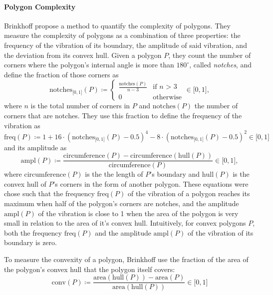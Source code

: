 \paragraph{Polygon Complexity}

Brinkhoff \etal{} \cite{brinkhoff1995measuring} propose a method to quantify the complexity of polygons.
They measure the complexity of polygons as a combination of three properties: the frequency of the vibration of its boundary, the amplitude of said vibration, and the deviation from its convex hull.
Given a polygon $P$, they count the number of corners where the polygon's internal angle is more than $180^\circ$, called \emph{notches}, and define the fraction of those corners as
%
\begin{equation*}
\text{notches}_{\lbrack0,1\rbrack}(P) \coloneqq
\begin{cases}
\frac{\text{notches}(P)}{n - 3} & \text{if $n$ > 3}\\
0 & \text{otherwise}
\end{cases}
\in \lbrack0,1\rbrack
,
\end{equation*}
%
where $n$ is the total number of corners in $P$ and $\text{notches}(P)$ the number of corners that are notches.
They use this fraction to define the frequency of the vibration as
%
\begin{equation*}
\text{freq}(P) \coloneqq 1
+ 16 \cdot (\text{notches}_{\lbrack0,1\rbrack}(P) - 0.5)^4
- 8 \cdot (\text{notches}_{\lbrack0,1\rbrack}(P) - 0.5)^2
\in \lbrack0,1\rbrack
\end{equation*}
%
and its amplitude as
\begin{equation*}
\text{ampl}(P) \coloneqq
\frac{\text{circumference}(P) - \text{circumference}(\text{hull}(P))}{\text{circumference}(P)}
\in \lbrack0,1\rbrack
,
\end{equation*}
%
where $\text{circumference}(P)$ is the the length of $P$'s boundary and $\text{hull}(P)$ is the convex hull of $P$'s corners in the form of another polygon.
These equations were chose such that the frequency $\text{freq}(P)$ of the vibration of a polygon reaches its maximum when half of the polygon's corners are notches, and the amplitude $\text{ampl}(P)$ of the vibration is close to 1 when the area of the polygon is very small in relation to the area of it's convex hull.
Intuitively, for convex polygons $P$, both the frequency $\text{freq}(P)$ and the amplitude $\text{ampl}(P)$ of the vibration of its boundary is zero.

To measure the convexity of a polygon, Brinkhoff \etal{} use the fraction of the area of the polygon's convex hull that the polygon itself covers:
%
\begin{equation*}
\text{conv}(P) \coloneqq
\frac{\text{area}(\text{hull}(P)) - \text{area}(P)}{\text{area}(\text{hull}(P))}
\in \lbrack0,1\rbrack
\end{equation*}

